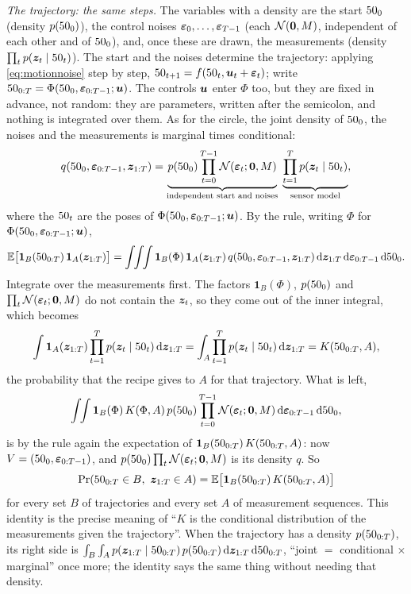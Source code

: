 \emph{The trajectory: the same steps.} The variables with a density are
the start $50_0$ (density $p(50_0)$), the control noises
$\bm{\varepsilon}_0,\dots,\bm{\varepsilon}_{T-1}$ (each $\mathcal{N}(\bm{0},M)$, independent
of each other and of $50_0$), and, once these are drawn, the measurements
(density $\prod_tp(\bm{z}_t\mid50_t)$). The start and the noises determine the
trajectory: applying \eqref{eq:motionnoise} step by step,
$50_{t+1}=f(50_t,\bm{u}_t+\bm{\varepsilon}_t)$; write
$50_{0:T}=\Phi(50_0,\bm{\varepsilon}_{0:T-1};\bm{u})$. The controls $\bm{u}$ enter
$\Phi$ too, but they are fixed in advance, not random: they are
parameters, written after the semicolon, and nothing is integrated over
them. As for the circle, the joint density of $50_0$, the noises and the
measurements is marginal times conditional:
\[
  q(50_0,\bm{\varepsilon}_{0:T-1},\bm{z}_{1:T})
  =\underbrace{p(50_0)\prod_{t=0}^{T-1}\mathcal{N}(\bm{\varepsilon}_t;\bm{0},M)}
   _{\text{independent start and noises}}\;
   \underbrace{\prod_{t=1}^Tp(\bm{z}_t\mid50_t)}_{\text{sensor model}},
\]
where the $50_t$ are the poses of $\Phi(50_0,\bm{\varepsilon}_{0:T-1};\bm{u})$. By
the rule, writing $\Phi$ for $\Phi(50_0,\bm{\varepsilon}_{0:T-1};\bm{u})$,
\[
  \mathbb{E}\bigl[\mathbf 1_B(50_{0:T})\,\mathbf 1_A(\bm{z}_{1:T})\bigr]
  =\int\!\!\int\!\!\int\mathbf 1_B(\Phi)\,\mathbf 1_A(\bm{z}_{1:T})\,
   q(50_0,\bm{\varepsilon}_{0:T-1},\bm{z}_{1:T})\,
   \mathrm d\bm{z}_{1:T}\,\mathrm d\bm{\varepsilon}_{0:T-1}\,\mathrm d50_0 .
\]
Integrate over the measurements first. The factors $\mathbf 1_B(\Phi)$,
$p(50_0)$ and $\prod_t\mathcal{N}(\bm{\varepsilon}_t;\bm{0},M)$ do not contain the
$\bm{z}_t$, so they come out of the inner integral, which becomes
\[
  \int\mathbf 1_A(\bm{z}_{1:T})\prod_{t=1}^Tp(\bm{z}_t\mid50_t)\,\mathrm d\bm{z}_{1:T}
  =\int_A\prod_{t=1}^Tp(\bm{z}_t\mid50_t)\,\mathrm d\bm{z}_{1:T}
  =K(50_{0:T},A),
\]
the probability that the recipe gives to $A$ for that trajectory. What is
left,
\[
  \int\!\!\int\mathbf 1_B(\Phi)\,K(\Phi,A)\,p(50_0)\prod_{t=0}^{T-1}
  \mathcal{N}(\bm{\varepsilon}_t;\bm{0},M)\,\mathrm d\bm{\varepsilon}_{0:T-1}\,\mathrm d50_0 ,
\]
is by the rule again the expectation of
$\mathbf 1_B(50_{0:T})\,K(50_{0:T},A)$: now $V=(50_0,\bm{\varepsilon}_{0:T-1})$,
and $p(50_0)\prod_t\mathcal{N}(\bm{\varepsilon}_t;\bm{0},M)$ is its density $q$. So
\[
  \Pr(50_{0:T}\in B,\ \bm{z}_{1:T}\in A)
  =\mathbb{E}\bigl[\mathbf 1_B(50_{0:T})\,K(50_{0:T},A)\bigr]
\]
for every set $B$ of trajectories and every set $A$ of measurement
sequences. This identity is the precise meaning of ``$K$ is the
conditional distribution of the measurements given the trajectory''. When
the trajectory has a density $p(50_{0:T})$, its right side is
$\int_B\int_Ap(\bm{z}_{1:T}\mid50_{0:T})\,p(50_{0:T})\,\mathrm d\bm{z}_{1:T}\,
\mathrm d50_{0:T}$, ``joint $=$ conditional $\times$ marginal'' once
more; the identity says the same thing without needing that density.

